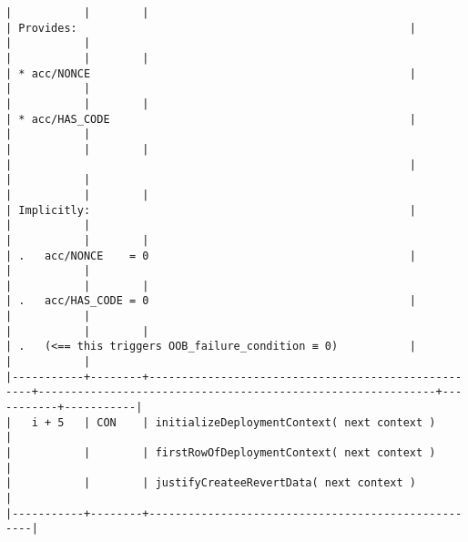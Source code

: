 \documentclass[varwidth=\maxdimen,margin=0.5cm,multi={verbatim}]{standalone}
\begin{document}
\begin{verbatim}
|           |        |                                                    | Provides:                                                   |           |           |
|           |        |                                                    | * acc/NONCE                                                 |           |           |
|           |        |                                                    | * acc/HAS_CODE                                              |           |           |
|           |        |                                                    |                                                             |           |           |
|           |        |                                                    | Implicitly:                                                 |           |           |
|           |        |                                                    | .   acc/NONCE    = 0                                        |           |           |
|           |        |                                                    | .   acc/HAS_CODE = 0                                        |           |           |
|           |        |                                                    | .   (<== this triggers OOB_failure_condition ≡ 0)           |           |           |
|-----------+--------+----------------------------------------------------+-------------------------------------------------------------+-----------+-----------|
|   i + 5   | CON    | initializeDeploymentContext( next context )        |
|           |        | firstRowOfDeploymentContext( next context )        |
|           |        | justifyCreateeRevertData( next context )           |
|-----------+--------+----------------------------------------------------|

\end{verbatim}
\end{document}
